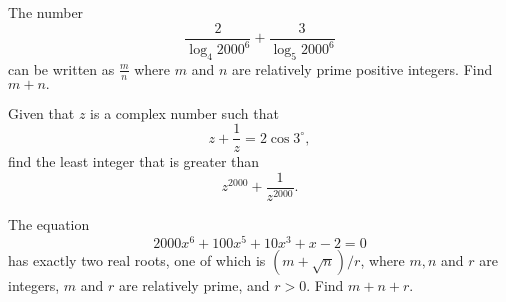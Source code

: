 %	












\begin{question}[name={2000 AIME II, \href{https://artofproblemsolving.com/community/c4p385882}{Problem 1}}]
	The number\[ \frac 2{\log_4{2000^6}}+\frac 3{\log_5{2000^6}} \]can be written as $\frac mn$ where $m$ and $n$ are relatively prime positive integers. Find $m+n.$
\end{question}


%	













\begin{question}[name={2000 AIME II, \href{https://artofproblemsolving.com/community/c4p385894}{Problem 9}}]
	Given that $z$ is a complex number such that $$z+\frac 1z=2\cos 3^\circ,$$ find the least integer that is greater than $$z^{2000}+\frac 1{z^{2000}}.$$
\end{question}


%	












\begin{question}[name={2000 AIME II, \href{https://artofproblemsolving.com/community/c4385899}{Problem 13}}]
	The equation $$2000x^6+100x^5+10x^3+x-2=0$$ has exactly two real roots, one of which is $(m+\sqrt{n})/r$, where $m, n$ and $r$ are integers, $m$ and $r$ are relatively prime, and $r>0.$ Find $m+n+r$.	
\end{question}


%	










